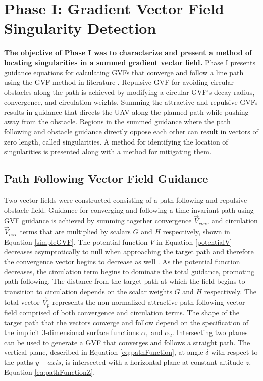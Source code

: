 \documentclass[numbered,pdftex]{ohio-etd}
\begin{document}
\section{Phase I: Gradient Vector Field Singularity Detection}
 \textbf{The objective of Phase I was to characterize and present a method of locating singularities in a summed gradient vector field.} Phase I presents guidance equations for calculating GVFs that converge and follow a line path using the GVF method in literature \cite{goncalves_artificial_2009,goncalves_circulation_2010,goncalves_vector_2010}. Repulsive GVF for avoiding circular obstacles along the path is achieved by modifying a circular GVF's decay radius, convergence, and circulation weights. Summing the attractive and repulsive GVFs results in guidance that directs the UAV along the planned path while pushing away from the obstacle. Regions in the summed guidance where the path following and obstacle guidance directly oppose each other can result in vectors of zero length, called singularities. A method for identifying the location of singularities is presented along with a method for mitigating them. 
 

\subsection{Path Following Vector Field Guidance}
Two vector fields were constructed consisting of a path following and repulsive obstacle field. Guidance for converging and following a time-invariant path using GVF guidance is achieved by summing together convergence $\overrightarrow{V}_{conv}$ and circulation $\overrightarrow{V}_{circ}$ terms that are multiplied by scalars $G$ and $H$ respectively, shown in Equation \ref{simpleGVF}. The potential function $V$ in Equation \ref{potentialV} decreases asymptotically to null when approaching the target path and therefore the convergence vector begins to decrease as well \cite{goncalves_artificial_2009}. As the potential function decreases, the circulation term begins to dominate the total guidance, promoting path following. The distance from the target path at which the field begins to transition to circulation depends on the scalar weights $G$ and $H$ respectively. The total vector $\overrightarrow{V}_p$ represents the non-normalized attractive path following vector field comprised of both convergence and circulation terms. The shape of the target path that the vectors converge and follow depend on the specification of the implicit 3-dimensional surface functions $\alpha_1$ and $\alpha_2$. Intersecting two planes can be used to generate a GVF that converges and follows a straight path. The vertical plane, described in Equation \ref{eq:pathFunction}, at angle $\delta$ with respect to the paths $y-axis$, is intersected with a horizontal plane at constant altitude $z$, Equation \ref{eq:pathFunctionZ}.
\end{document}
